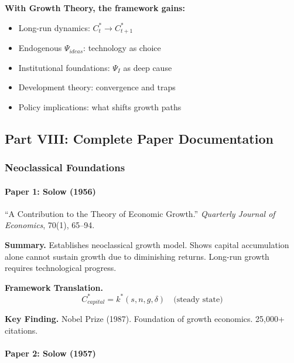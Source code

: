 \textbf{With Growth Theory, the framework gains:}
\begin{itemize}
    \item Long-run dynamics: $C^*_t \to C^*_{t+1}$
    \item Endogenous $\Psi_{ideas}$: technology as choice
    \item Institutional foundations: $\Psi_I$ as deep cause
    \item Development theory: convergence and traps
    \item Policy implications: what shifts growth paths
\end{itemize}

\subsection{Part VIII: Complete Paper Documentation}

\subsubsection{Neoclassical Foundations}

\paragraph{Paper 1: Solow (1956)}

``A Contribution to the Theory of Economic Growth.''
\textit{Quarterly Journal of Economics}, 70(1), 65--94.

\textbf{Summary.}
Establishes neoclassical growth model. Shows capital accumulation alone cannot 
sustain growth due to diminishing returns. Long-run growth requires technological progress.

\textbf{Framework Translation.}
\begin{equation}
C^*_{capital} = k^*(s, n, g, \delta) \quad \text{(steady state)}
\end{equation}

\textbf{Key Finding.}
Nobel Prize (1987). Foundation of growth economics. 25,000+ citations.

\paragraph{Paper 2: Solow (1957)}


